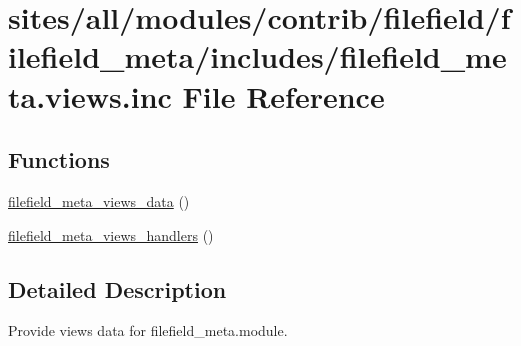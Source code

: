 \hypertarget{filefield__meta_8views_8inc}{
\section{sites/all/modules/contrib/filefield/filefield\_\-meta/includes/filefield\_\-meta.views.inc File Reference}
\label{filefield__meta_8views_8inc}
}
\subsection*{Functions}
\begin{CompactItemize}
\item 
\hyperlink{group__views__filefield__meta__module_g3536b66b031e4b5d07f14859e769ea45}{filefield\_\-meta\_\-views\_\-data} ()
\item 
\hyperlink{group__views__filefield__meta__module_g30b239ece7653738ac7c53d667855ee4}{filefield\_\-meta\_\-views\_\-handlers} ()
\end{CompactItemize}


\subsection{Detailed Description}
Provide views data for filefield\_\-meta.module. 